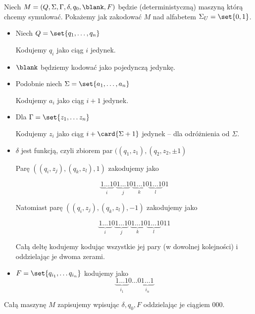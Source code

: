 Niech \( M = (Q, \Sigma, \Gamma, \delta, q_0, \blank, F) \) będzie (deterministyczną) maszyną którą chcemy symulować. Pokażemy jak zakodować \( M \) nad alfabetem \( \Sigma_U = \set{0, 1} \).

\begin{itemize}
	\item Niech \( Q = \set{q_1, \dots, q_n} \)

	      Kodujemy \( q_i \) jako ciąg \( i \) jedynek.

	\item \( \blank \) będziemy kodować jako pojedynczą jedynkę.


	\item Podobnie niech \( \Sigma = \set{a_1, \dots, a_n} \)

	      Kodujemy \( a_i \) jako ciąg \( i + 1 \) jedynek.

	\item Dla \( \Gamma = \set{z_1, \dots z_n} \)

	      Kodujemy \( z_i \) jako ciąg \( i + \card{\Sigma + 1} \) jedynek -- dla odróżnienia od \( \Sigma \).

	\item \( \delta \) jest funkcją, czyli zbiorem par \( ((q_1, z_1), (q_2, z_2, \pm 1) \)

	      Parę \( ((q_i, z_j), (q_k, z_l), 1) \) zakodujemy jako

	      \[
		      \underbrace{1 \dots 1}_i
		      0
		      \underbrace{1 \dots 1}_j
		      0
		      \underbrace{1 \dots 1}_k
		      0
		      \underbrace{1 \dots 1}_l
		      0
		      1
	      \]

	      Natomiast parę \( ((q_i, z_j), (q_k, z_l), -1) \) zakodujemy jako

	      \[
		      \underbrace{1 \dots 1}_i
		      0
		      \underbrace{1 \dots 1}_j
		      0
		      \underbrace{1 \dots 1}_k
		      0
		      \underbrace{1 \dots 1}_l
		      0
		      11
	      \]

	      Całą deltę kodujemy kodując wszystkie jej pary (w dowolnej kolejności) i oddzielając je dwoma zerami.

	\item \( F = \set{q_{i_1}, \dots q_{i_n}} \) kodujemy jako
	      \[
		      \underbrace{1 \dots 1}_{i_1} 0 \dots 0 \underbrace{1 \dots 1}_{i_n}
	      \]
\end{itemize}

Całą maszynę \( M \) zapisujemy wpisując \( \delta, q_0, F \) oddzielając je ciągiem \( 000 \).

